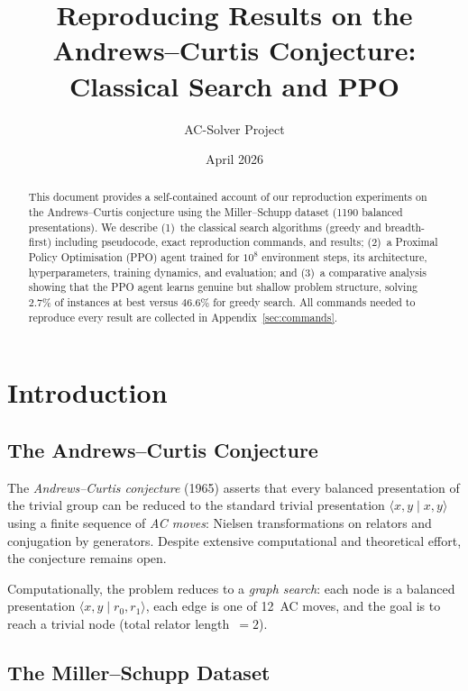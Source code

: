 \documentclass[11pt,a4paper]{article}
\title{Reproducing Results on the Andrews--Curtis Conjecture:\\
  Classical Search and PPO}
\author{AC-Solver Project}
\date{April 2026}
\newcommand{\pres}[2]{\langle #1 \mid #2 \rangle}
\begin{document}
\maketitle

\begin{abstract}
This document provides a self-contained account of our reproduction experiments
on the Andrews--Curtis conjecture using the Miller--Schupp dataset (1190
balanced presentations).  We describe (1)~the classical search algorithms
(greedy and breadth-first) including pseudocode, exact reproduction commands,
and results; (2)~a Proximal Policy Optimisation (PPO) agent trained for $10^8$
environment steps, its architecture, hyperparameters, training dynamics, and
evaluation; and (3)~a comparative analysis showing that the PPO agent learns
genuine but shallow problem structure, solving $2.7\%$ of instances at best
versus $46.6\%$ for greedy search.  All commands needed to reproduce every
result are collected in Appendix~\ref{sec:commands}.
\end{abstract}

\tableofcontents
\newpage

\section{Introduction}\label{sec:intro}

\subsection{The Andrews--Curtis Conjecture}

The \emph{Andrews--Curtis conjecture} (1965) asserts that every balanced
presentation of the trivial group can be reduced to the standard trivial
presentation $\pres{x,y}{x,y}$ using a finite sequence of \emph{AC moves}:
Nielsen transformations on relators and conjugation by generators.  Despite
extensive computational and theoretical effort, the conjecture remains open.

Computationally, the problem reduces to a \emph{graph search}: each node is a
balanced presentation $\pres{x,y}{r_0, r_1}$, each edge is one of 12~AC moves,
and the goal is to reach a trivial node (total relator length~$= 2$).

\subsection{The Miller--Schupp Dataset}
\end{document}
